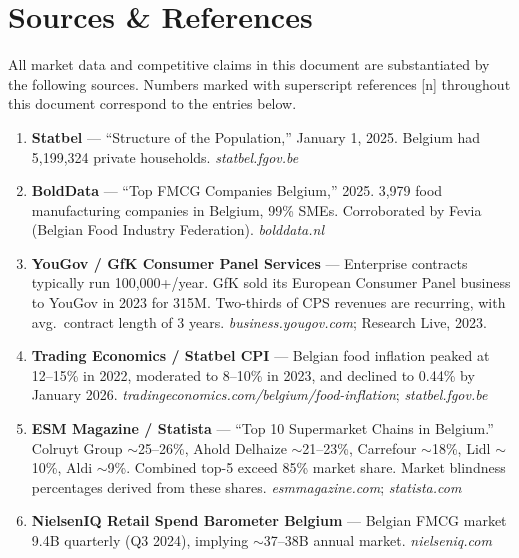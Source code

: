 \documentclass[11pt,a4paper]{article}
\begin{document}
\clearpage

\section{Sources \& References}

{\small All market data and competitive claims in this document are substantiated by the following sources. Numbers marked with superscript references {\scriptsize [n]} throughout this document correspond to the entries below.}

\vspace{0.5em}

\begin{enumerate}[leftmargin=1.5em, itemsep=2pt, font=\small]
  \item[\textbf{[1]}] \textbf{Statbel} --- ``Structure of the Population,'' January 1, 2025. Belgium had 5,199,324 private households. \textit{statbel.fgov.be}
  \item[\textbf{[2]}] \textbf{BoldData} --- ``Top FMCG Companies Belgium,'' 2025. 3,979 food manufacturing companies in Belgium, 99\% SMEs. Corroborated by Fevia (Belgian Food Industry Federation). \textit{bolddata.nl}
  \item[\textbf{[3]}] \textbf{YouGov / GfK Consumer Panel Services} --- Enterprise contracts typically run \texteuro{}100,000+/year. GfK sold its European Consumer Panel business to YouGov in 2023 for \texteuro{}315M. Two-thirds of CPS revenues are recurring, with avg.\ contract length of 3 years. \textit{business.yougov.com}; Research Live, 2023.
  \item[\textbf{[4]}] \textbf{Trading Economics / Statbel CPI} --- Belgian food inflation peaked at 12--15\% in 2022, moderated to 8--10\% in 2023, and declined to 0.44\% by January 2026. \textit{tradingeconomics.com/belgium/food-inflation}; \textit{statbel.fgov.be}
  \item[\textbf{[5]}] \textbf{ESM Magazine / Statista} --- ``Top 10 Supermarket Chains in Belgium.'' Colruyt Group $\sim$25--26\%, Ahold Delhaize $\sim$21--23\%, Carrefour $\sim$18\%, Lidl $\sim$10\%, Aldi $\sim$9\%. Combined top-5 exceed 85\% market share. Market blindness percentages derived from these shares. \textit{esmmagazine.com}; \textit{statista.com}
  \item[\textbf{[6]}] \textbf{NielsenIQ Retail Spend Barometer Belgium} --- Belgian FMCG market \texteuro{}9.4B quarterly (Q3 2024), implying $\sim$\texteuro{}37--38B annual market. \textit{nielseniq.com}

\end{enumerate}
\end{document}
